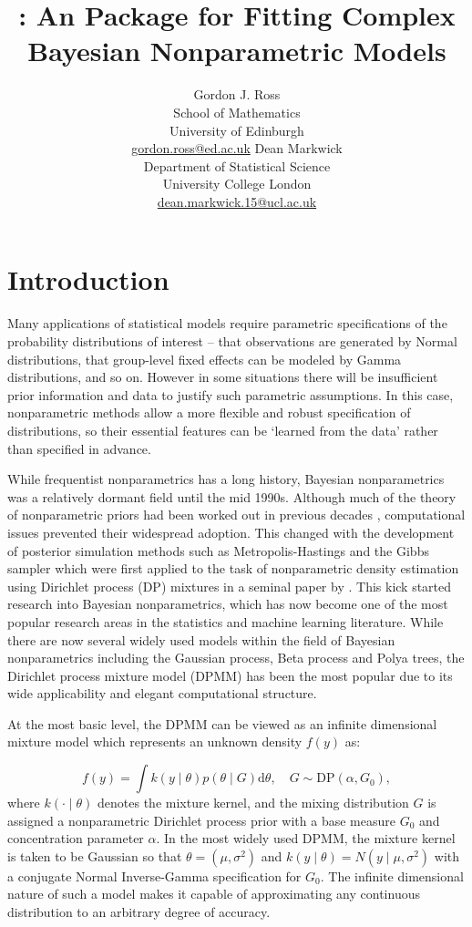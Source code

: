 \documentclass[nojss]{jss}
\author{Gordon J. Ross\\School of Mathematics\\University of Edinburgh\\\href{Gordon.Ross@ed.ac.uk}{gordon.ross@ed.ac.uk} \And
Dean Markwick\\Department of Statistical Science\\University College London\\\href{dean.markwick.15@ucl.ac.uk}{dean.markwick.15@ucl.ac.uk}}
\title{\pkg{dirichletprocess}: An \proglang{R} Package for Fitting Complex Bayesian Nonparametric Models}
\begin{document}
\section[Introduction]{Introduction} \label{sec:intro}

Many applications of statistical models require parametric specifications of the probability distributions of interest -- that observations are generated by Normal distributions, that group-level fixed effects can be modeled by Gamma distributions, and so on. However in some situations there will be insufficient prior information and data to justify such parametric assumptions. In this case, nonparametric methods allow a more flexible and robust specification of distributions, so their  essential features can be `learned from the data' rather than specified in advance.

While frequentist nonparametrics has a long history, Bayesian nonparametrics was a relatively dormant field until the mid 1990s. Although much of the theory of nonparametric priors had been worked out in previous decades \citep{ferguson_bayesian_1973}, computational issues prevented their widespread adoption. This changed with the development of posterior simulation methods such as Metropolis-Hastings \citep{hastings_monte_1970} and the Gibbs sampler \citep{geman_stochastic_1984} which were first applied to the task of nonparametric density estimation using Dirichlet process (DP) mixtures in a seminal paper by \cite{escobar_bayesian_1995}. This kick started research into Bayesian nonparametrics, which has now become one of the most popular research areas in the statistics and machine learning literature. While there are now several widely used models within the field of Bayesian nonparametrics including the Gaussian process, Beta process and Polya trees, the Dirichlet process mixture model (DPMM) has been the most popular due to its wide applicability and elegant computational structure.

At the most basic level, the DPMM can be viewed as an infinite dimensional mixture model which represents an unknown density $f(y)$ as:

\begin{equation*}
f(y) = \int k(y \mid \theta) p(\theta \mid G) \mathrm{d} \theta, \quad G \sim \text{DP}(\alpha, G_0),
\end{equation*}
where $k(\cdot \mid \theta)$ denotes the mixture kernel, and the mixing distribution $G$ is assigned a nonparametric Dirichlet process prior with a base measure $G_0$ and concentration parameter $\alpha$. In the most widely used DPMM, the mixture kernel is taken to be Gaussian so that $\theta = (\mu,\sigma^2)$ and $k(y\mid\theta) = N(y\mid \mu,\sigma^2)$ with a conjugate Normal Inverse-Gamma specification for $G_0$. The infinite dimensional nature of such a model makes it capable of approximating any continuous distribution to an arbitrary degree of accuracy.
\end{document}
